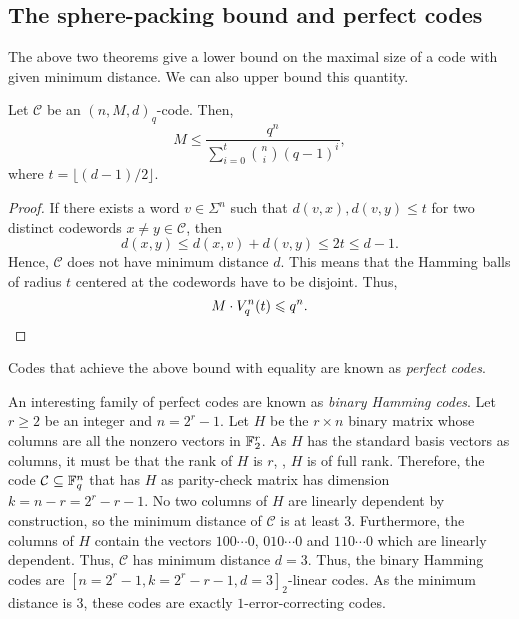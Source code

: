 \documentclass[../main.tex]{subfiles}
\begin{document}
\subsection{The sphere-packing bound and perfect codes}

The above two theorems give a lower bound on the maximal size of a code with given minimum distance. We can also upper bound this quantity.

\begin{theorem}\label{thm:sphere_packing_bound}
Let $\mathcal{C}$ be an $(n, M, d)_q$-code. Then,
\begin{equation*}
    M \leq \frac{q^n}{\sum_{i=0}^t \binom{n}{i} (q - 1)^i},
\end{equation*}
where $t = \lfloor (d - 1) / 2 \rfloor$.
\end{theorem}

\begin{proof}
If there exists a word $v \in \Sigma^n$ such that $d(v, x), d(v, y) \leq t$ for two distinct codewords $x \neq y \in \mathcal{C}$, then
\begin{equation*}
    d(x, y) \leq d(x, v) + d(v, y) \leq 2t \leq d - 1.
\end{equation*}
Hence, $\mathcal{C}$ does not have minimum distance $d$. This means that the Hamming balls of radius $t$ centered at the codewords have to be disjoint. Thus,
\begin{equation*}
    M \cdot V_q^n(t) \leq q^n. \qedhere
\end{equation*}
\end{proof}

Codes that achieve the above bound with equality are known as \emph{perfect codes}.

An interesting family of perfect codes are known as \emph{binary Hamming codes}. Let $r \geq 2$ be an integer and $n = 2^r - 1$. Let $H$ be the $r \times n$ binary matrix whose columns are all the nonzero vectors in $\F_2^r$. As $H$ has the standard basis vectors as columns, it must be that the rank of $H$ is $r$, \ie, $H$ is of full rank. Therefore, the code $\mathcal{C} \subseteq \F_q^n$ that has $H$ as parity-check matrix has dimension $k = n - r = 2^r - r - 1$. No two columns of $H$ are linearly dependent by construction, so the minimum distance of $\mathcal{C}$ is at least 3. Furthermore, the columns of $H$ contain the vectors $100 \cdots 0$, $010 \cdots 0$ and $110 \cdots 0$ which are linearly dependent. Thus, $\mathcal{C}$ has minimum distance $d = 3$. Thus, the binary Hamming codes are $[n = 2^r - 1, k = 2^r - r - 1, d = 3]_2$-linear codes. As the minimum distance is $3$, these codes are exactly $1$-error-correcting codes.
\end{document}
